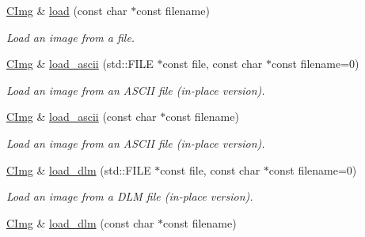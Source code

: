  \begin{DoxyCompactItemize}
\item 
\hyperlink{structcimg__library_1_1_c_img}{CImg} \& \hyperlink{structcimg__library_1_1_c_img_ac232288147b4167d8daca12e752de20a}{load} (const char $\ast$const filename)
\begin{DoxyCompactList}\small\item\em Load an image from a file. \item\end{DoxyCompactList}\item 
\hypertarget{structcimg__library_1_1_c_img_affd7ab580b1ab0cfa26a40b6af7fb86d}{
\hyperlink{structcimg__library_1_1_c_img}{CImg} \& \hyperlink{structcimg__library_1_1_c_img_affd7ab580b1ab0cfa26a40b6af7fb86d}{load\_\-ascii} (std::FILE $\ast$const file, const char $\ast$const filename=0)}
\label{structcimg__library_1_1_c_img_affd7ab580b1ab0cfa26a40b6af7fb86d}

\begin{DoxyCompactList}\small\item\em Load an image from an ASCII file (in-\/place version). \item\end{DoxyCompactList}\item 
\hypertarget{structcimg__library_1_1_c_img_af1dea28069ae9ee32a012132a5bb0c6b}{
\hyperlink{structcimg__library_1_1_c_img}{CImg} \& \hyperlink{structcimg__library_1_1_c_img_af1dea28069ae9ee32a012132a5bb0c6b}{load\_\-ascii} (const char $\ast$const filename)}
\label{structcimg__library_1_1_c_img_af1dea28069ae9ee32a012132a5bb0c6b}

\begin{DoxyCompactList}\small\item\em Load an image from an ASCII file (in-\/place version). \item\end{DoxyCompactList}\item 
\hypertarget{structcimg__library_1_1_c_img_affed02ce9bac68896151e61de1cd1228}{
\hyperlink{structcimg__library_1_1_c_img}{CImg} \& \hyperlink{structcimg__library_1_1_c_img_affed02ce9bac68896151e61de1cd1228}{load\_\-dlm} (std::FILE $\ast$const file, const char $\ast$const filename=0)}
\label{structcimg__library_1_1_c_img_affed02ce9bac68896151e61de1cd1228}

\begin{DoxyCompactList}\small\item\em Load an image from a DLM file (in-\/place version). \item\end{DoxyCompactList}\item 
\hypertarget{structcimg__library_1_1_c_img_a7c3741920165adcc8958207802e5dcd8}{
\hyperlink{structcimg__library_1_1_c_img}{CImg} \& \hyperlink{structcimg__library_1_1_c_img_a7c3741920165adcc8958207802e5dcd8}{load\_\-dlm} (const char $\ast$const filename)}
\label{structcimg__library_1_1_c_img_a7c3741920165adcc8958207802e5dcd8}


\end{DoxyCompactItemize}
